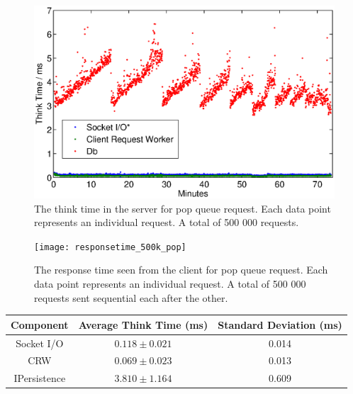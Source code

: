 \documentclass{article}
\begin{document}
            \begin{figure}[H]
                \hspace{-1.5cm}
                \includegraphics[scale=0.50]{thinktime_500k_pop}
                \caption{The think time in the server for pop queue request. Each data point represents an individual request. A total of 500 000 requests.}
                \label{fig:thinktime_500k_pop}
            \end{figure}
            
            \begin{figure}[H]
                \hspace{-1.5cm}
                \texttt{[image: responsetime\_500k\_pop]}
                \caption{The response time seen from the client for pop queue request. Each data point represents an individual request. A total of 500 000 requests sent sequential each after the other.}
                \label{fig:responsetime_500k_pop}
            \end{figure}
            
            \begin{tabular}{|c|c|c|}
                \hline 
            \textbf{Component} & \textbf{Average Think Time} (ms)  & \textbf{Standard Deviation (ms)} \\ 
            \hline 
            Socket I/O & $0.118\pm0.021$ &0.014 \\ 
            \hline 
            CRW & $0.069\pm0.023$ &0.013 \\ 
            \hline 
            IPersistence & $3.810\pm1.164$ &0.609 \\ 
            \hline 
            \end{tabular} 
            
\end{document}

